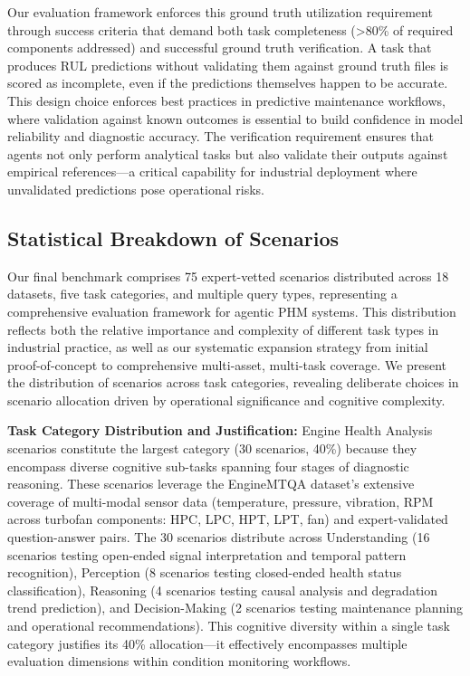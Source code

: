 \documentclass[sigconf, screen, nonacm]{acmart}
\begin{document}
Our evaluation framework enforces this ground truth utilization requirement through success criteria that demand both task completeness (\textgreater80\% of required components addressed) and successful ground truth verification. A task that produces RUL predictions without validating them against ground truth files is scored as incomplete, even if the predictions themselves happen to be accurate. This design choice enforces best practices in predictive maintenance workflows, where validation against known outcomes is essential to build confidence in model reliability and diagnostic accuracy. The verification requirement ensures that agents not only perform analytical tasks but also validate their outputs against empirical references---a critical capability for industrial deployment where unvalidated predictions pose operational risks.


\subsection{Statistical Breakdown of Scenarios}

Our final benchmark comprises 75 expert-vetted scenarios distributed across 18 datasets, five task categories, and multiple query types, representing a comprehensive evaluation framework for agentic PHM systems. This distribution reflects both the relative importance and complexity of different task types in industrial practice, as well as our systematic expansion strategy from initial proof-of-concept to comprehensive multi-asset, multi-task coverage. We present the distribution of scenarios across task categories, revealing deliberate choices in scenario allocation driven by operational significance and cognitive complexity.

\textbf{Task Category Distribution and Justification:} Engine Health Analysis scenarios constitute the largest category (30 scenarios, 40\%) because they encompass diverse cognitive sub-tasks spanning four stages of diagnostic reasoning. These scenarios leverage the EngineMTQA dataset's extensive coverage of multi-modal sensor data (temperature, pressure, vibration, RPM across turbofan components: HPC, LPC, HPT, LPT, fan) and expert-validated question-answer pairs. The 30 scenarios distribute across Understanding (16 scenarios testing open-ended signal interpretation and temporal pattern recognition), Perception (8 scenarios testing closed-ended health status classification), Reasoning (4 scenarios testing causal analysis and degradation trend prediction), and Decision-Making (2 scenarios testing maintenance planning and operational recommendations). This cognitive diversity within a single task category justifies its 40\% allocation---it effectively encompasses multiple evaluation dimensions within condition monitoring workflows.
\end{document}
